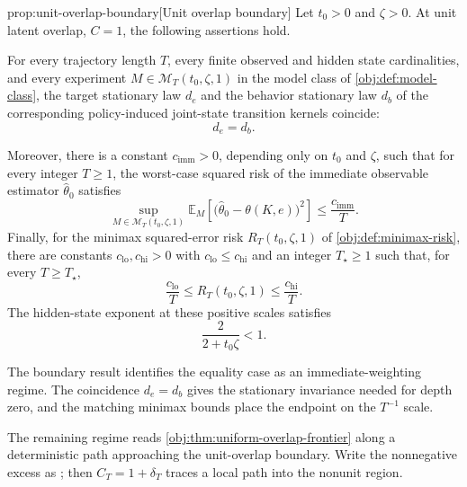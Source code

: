 \begin{theoremv}{prop:unit-overlap-boundary}[Unit overlap boundary]
Let \(t_0>0\) and \(\zeta>0\). At unit latent overlap, \(C=1\), the following assertions hold.

For every trajectory length \(T\), every finite observed and hidden state cardinalities, and every experiment \(M\in\mathcal M_T(t_0,\zeta,1)\) in the model class of \cref{obj:def:model-class}, the target stationary law \(d_e\) and the behavior stationary law \(d_b\) of the corresponding policy-induced joint-state transition kernels coincide:
\[
d_e=d_b .
\]

Moreover, there is a constant \(c_{\mathrm{imm}}>0\), depending only on \(t_0\) and \(\zeta\), such that for every integer \(T\ge 1\), the worst-case squared risk of the immediate observable estimator \(\widehat\theta_0\) satisfies
\[
\sup_{M\in\mathcal M_T(t_0,\zeta,1)}
\mathbb E_M\!\left[\bigl(\widehat\theta_0-\theta(K,e)\bigr)^2\right]
\le \frac{c_{\mathrm{imm}}}{T}.
\]
Finally, for the minimax squared-error risk \(R_T(t_0,\zeta,1)\) of \cref{obj:def:minimax-risk}, there are constants \(c_{\mathrm{lo}},c_{\mathrm{hi}}>0\) with \(c_{\mathrm{lo}}\le c_{\mathrm{hi}}\) and an integer \(T_\star\ge 1\) such that, for every \(T\ge T_\star\),
\[
\frac{c_{\mathrm{lo}}}{T}
\le
R_T(t_0,\zeta,1)
\le
\frac{c_{\mathrm{hi}}}{T}.
\]
The hidden-state exponent at these positive scales satisfies
\[
\frac{2}{2+t_0\zeta}<1 .
\]
\end{theoremv}

The boundary result identifies the equality case as an immediate-weighting regime. The coincidence \(d_e=d_b\) gives the stationary invariance needed for depth zero, and the matching minimax bounds place the endpoint on the \(T^{-1}\) scale.

The remaining regime reads \cref{obj:thm:uniform-overlap-frontier} along a deterministic path approaching the unit-overlap boundary. Write the nonnegative excess as ; then \(C_T=1+\delta_T\) traces a local path into the nonunit region.


